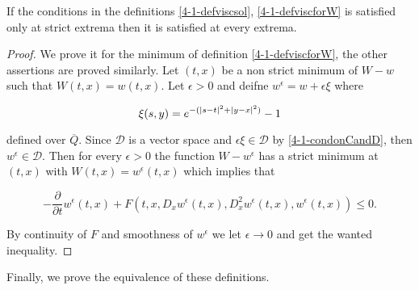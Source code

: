 \begin{lemma}
    If the conditions in the definitions \ref{4-1-defviscsol}, \ref{4-1-defviscforW} is satisfied only at strict extrema 
    then it is satisfied at every extrema.

    \begin{proof}
        We prove it for the minimum of definition \ref{4-1-defviscforW}, the other assertions are proved similarly. Let 
        $(t,x)$ be a non strict minimum of $W-w$ such that $W(t,x)=w(t,x)$. Let $\epsilon>0$ and deifne $w^{\epsilon}=w+\epsilon\xi$ where
        
        \[\xi(s,y)=e^{-(\abs{s-t}^2+\abs{y-x}^2)}-1\]

        defined over $\overline{Q}$. Since $\mathcal{D}$ is a vector space and $\epsilon\xi\in\mathcal{D}$ by \ref{4-1-condonCandD}, then 
        $w^{\epsilon}\in\mathcal{D}$. Then for every $\epsilon>0$ the function $W-w^{\epsilon}$ has a strict minimum at $(t,x)$ with $W(t,x)=w^{\epsilon}(t,x)$ which 
        implies that
        
        \[-\frac{\partial}{\partial t}w^{\epsilon}(t,x) + F(t,x,D_xw^{\epsilon}(t,x),D_x^2w^{\epsilon}(t,x),w^{\epsilon}(t,x))\leq0.\]

        By continuity of $F$ and smoothness of $w^{\epsilon}$ we let $\epsilon\to0$ and get the wanted inequality.
    \end{proof}
\end{lemma}


Finally, we prove the equivalence of these definitions. 

